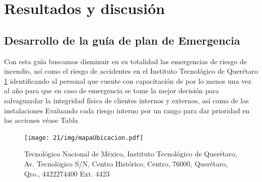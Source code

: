    
    \section{Resultados y discusión}
    
    \subsection{Desarrollo de la guía de plan de Emergencia}
    
    Con esta guía buscamos disminuir en su totalidad las emergencias de riesgo de incendio, así como el riesgo de accidentes en el Instituto Tecnológico de Querétaro \ref{fig:mapaUbicacion} identificando al personal que cuente con capacitación de por lo menos una vez al año para que en caso de emergencia se tome la mejor decisión para salvaguardar la integridad física de clientes internos y externos, así como de las instalaciones
    Evaluando cada riesgo interno por un rango para dar prioridad en las acciones véase Tabla %
    
    
    \begin{figure}[H]
        \centering
        \texttt{[image: 21/img/mapaUbicacion.pdf]}
        \caption{Tecnológico Nacional de México, Instituto Tecnológico de Querétaro, Av. Tecnológico S/N, Centro Histórico, Centro, 76000, Querétaro, Qro., 4422274400 Ext. 4423}
        \label{fig:mapaUbicacion}
    \end{figure}
    
